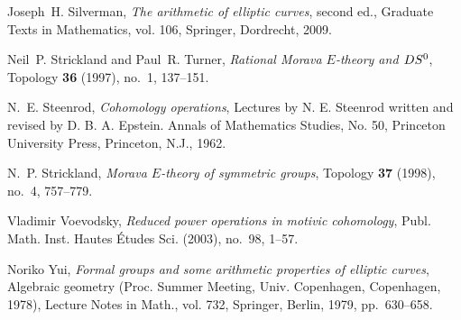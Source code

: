 \documentclass{gtpart}
\theoremstyle{definition}
\theoremstyle{remark}
\begin{document}
\begin{thebibliography}
Joseph~H. Silverman, \emph{The arithmetic of elliptic curves}, second ed.,
  Graduate Texts in Mathematics, vol. 106, Springer, Dordrecht, 2009.

Neil~P. Strickland and Paul~R. Turner, \emph{Rational {M}orava {$E$}-theory and
  {$DS\sp 0$}}, Topology \textbf{36} (1997), no.~1, 137--151. 

N.~E. Steenrod, \emph{Cohomology operations}, Lectures by N. E. Steenrod
  written and revised by D. B. A. Epstein. Annals of Mathematics Studies, No.
  50, Princeton University Press, Princeton, N.J., 1962. 

N.~P. Strickland, \emph{Morava {$E$}-theory of symmetric groups}, Topology
  \textbf{37} (1998), no.~4, 757--779. 

Vladimir Voevodsky, \emph{Reduced power operations in motivic cohomology},
  Publ. Math. Inst. Hautes \'Etudes Sci. (2003), no.~98, 1--57. 

Noriko Yui, \emph{Formal groups and some arithmetic properties of elliptic
  curves}, Algebraic geometry ({P}roc. {S}ummer {M}eeting, {U}niv.
  {C}openhagen, {C}openhagen, 1978), Lecture Notes in Math., vol. 732,
  Springer, Berlin, 1979, pp.~630--658. 

\end{thebibliography}
\end{document}
